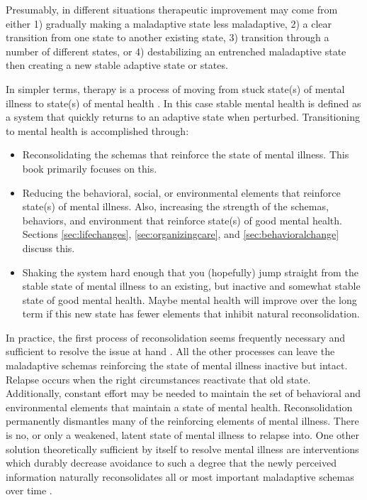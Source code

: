 \documentclass[12pt,letterpaper]{book}
\begin{document}
Presumably, in different situations therapeutic improvement may come from either 1) gradually making a maladaptive state less maladaptive, 2) a clear transition from one state to another existing state, 3) transition through a number of different states, or 4) destabilizing an entrenched maladaptive state then creating a new stable adaptive state or states.

In simpler terms, therapy is a process of moving from stuck state(s) of mental illness to state(s) of mental health \cite{hayes2020complex,friston2010free}. In this case stable mental health is defined as a system that quickly returns to an adaptive state when perturbed. Transitioning to mental health is accomplished through:
\begin{itemize}
    \item Reconsolidating the schemas that reinforce the state of mental illness. This book primarily focuses on this.
    \item Reducing the behavioral, social, or environmental elements that reinforce state(s) of mental illness. Also, increasing the strength of the schemas, behaviors, and environment that reinforce state(s) of good mental health. Sections \ref{sec:lifechanges}, \ref{sec:organizingcare}, and \ref{sec:behavioralchange} discuss this.
    \item Shaking the system hard enough that you (hopefully) jump straight from the stable state of mental illness to an existing, but inactive and somewhat stable state of good mental health. Maybe mental health will improve over the long term if this new state has fewer elements that inhibit natural reconsolidation.
\end{itemize}
In practice, the first process of reconsolidation seems frequently necessary and sufficient to resolve the issue at hand \cite{eckerUnlocking}. All the other processes can leave the maladaptive schemas reinforcing the state of mental illness inactive but intact. Relapse occurs when the right circumstances reactivate that old state. Additionally, constant effort may be needed to maintain the set of behavioral and environmental elements that maintain a state of mental health. Reconsolidation permanently dismantles many of the reinforcing elements of mental illness. There is no, or only a weakened, latent state of mental illness to relapse into. One other solution theoretically sufficient by itself to resolve mental illness are interventions which durably decrease avoidance to such a degree that the newly perceived information naturally reconsolidates all or most important maladaptive schemas over time \cite{berghSelfEvidencing}.
\end{document}
